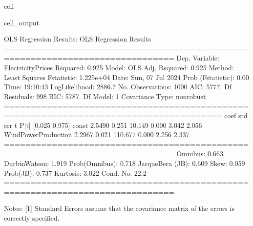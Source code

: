 \documentclass[letterpaper,10pt,english]{jupyterBook}
\begin{document}
\begin{sphinxuseclass}{cell}
\begin{sphinxVerbatimOutput}
\begin{sphinxuseclass}{cell_output}
\begin{sphinxVerbatim}[commandchars=\\\{\}]
OLS Regression Results:
                            OLS Regression Results                            
==============================================================================
Dep. Variable:      ElectricityPrices   R\PYGZhy{}squared:                       0.925
Model:                            OLS   Adj. R\PYGZhy{}squared:                  0.925
Method:                 Least Squares   F\PYGZhy{}statistic:                 1.225e+04
Date:                Sun, 07 Jul 2024   Prob (F\PYGZhy{}statistic):               0.00
Time:                        19:10:43   Log\PYGZhy{}Likelihood:                \PYGZhy{}2886.7
No. Observations:                1000   AIC:                             5777.
Df Residuals:                     998   BIC:                             5787.
Df Model:                           1                                         
Covariance Type:            nonrobust                                         
=======================================================================================
                          coef    std err          t      P\PYGZgt{}|t|      [0.025      0.975]
\PYGZhy{}\PYGZhy{}\PYGZhy{}\PYGZhy{}\PYGZhy{}\PYGZhy{}\PYGZhy{}\PYGZhy{}\PYGZhy{}\PYGZhy{}\PYGZhy{}\PYGZhy{}\PYGZhy{}\PYGZhy{}\PYGZhy{}\PYGZhy{}\PYGZhy{}\PYGZhy{}\PYGZhy{}\PYGZhy{}\PYGZhy{}\PYGZhy{}\PYGZhy{}\PYGZhy{}\PYGZhy{}\PYGZhy{}\PYGZhy{}\PYGZhy{}\PYGZhy{}\PYGZhy{}\PYGZhy{}\PYGZhy{}\PYGZhy{}\PYGZhy{}\PYGZhy{}\PYGZhy{}\PYGZhy{}\PYGZhy{}\PYGZhy{}\PYGZhy{}\PYGZhy{}\PYGZhy{}\PYGZhy{}\PYGZhy{}\PYGZhy{}\PYGZhy{}\PYGZhy{}\PYGZhy{}\PYGZhy{}\PYGZhy{}\PYGZhy{}\PYGZhy{}\PYGZhy{}\PYGZhy{}\PYGZhy{}\PYGZhy{}\PYGZhy{}\PYGZhy{}\PYGZhy{}\PYGZhy{}\PYGZhy{}\PYGZhy{}\PYGZhy{}\PYGZhy{}\PYGZhy{}\PYGZhy{}\PYGZhy{}\PYGZhy{}\PYGZhy{}\PYGZhy{}\PYGZhy{}\PYGZhy{}\PYGZhy{}\PYGZhy{}\PYGZhy{}\PYGZhy{}\PYGZhy{}\PYGZhy{}\PYGZhy{}\PYGZhy{}\PYGZhy{}\PYGZhy{}\PYGZhy{}\PYGZhy{}\PYGZhy{}\PYGZhy{}\PYGZhy{}
const                  \PYGZhy{}2.5490      0.251    \PYGZhy{}10.149      0.000      \PYGZhy{}3.042      \PYGZhy{}2.056
WindPowerProduction     2.2967      0.021    110.677      0.000       2.256       2.337
==============================================================================
Omnibus:                        0.663   Durbin\PYGZhy{}Watson:                   1.919
Prob(Omnibus):                  0.718   Jarque\PYGZhy{}Bera (JB):                0.609
Skew:                          \PYGZhy{}0.059   Prob(JB):                        0.737
Kurtosis:                       3.022   Cond. No.                         22.2
==============================================================================

Notes:
[1] Standard Errors assume that the covariance matrix of the errors is correctly specified.
\end{sphinxVerbatim}

\end{sphinxuseclass}\end{sphinxVerbatimOutput}

\end{sphinxuseclass}
\end{document}
